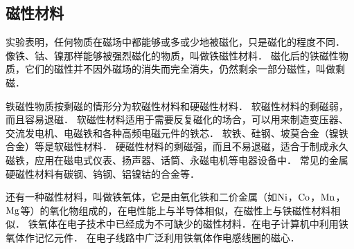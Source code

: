 \subsection{磁性材料}

实验表明，任何物质在磁场中都能够或多或少地被磁化，只是磁化的程度不同．
像铁、钴、镍那样能够被强烈磁化的物质，叫做铁磁性材料．
磁化后的铁磁性物质，它们的磁性并不因外磁场的消失而完全消失，仍然剩余一部分磁性，叫做剩磁．

铁磁性物质按剩磁的情形分为软磁性材料和硬磁性材料．
软磁性材料的剩磁弱，而且容易退磁．
软磁性材料适用于需要反复磁化的场合，可以用来制造变压器、交流发电机、电磁铁和各种高频电磁元件的铁芯．
软铁、硅钢、坡莫合金（镍铁合金）等是软磁性材料．
硬磁性材料的剩磁强，而且不易退磁，适合于制成永久磁铁，应用在磁电式仪表、扬声器、话筒、永磁电机等电器设备中．
常见的金属硬磁性材料有碳钢、钨钢、铝镍钴的合金等．

还有一种磁性材料，叫做铁氧体，它是由氧化铁和二价金属（如$ \rm{Ni} $，$ \rm{Co} $，$ \rm{Mn} $，$ \rm{Mg} $等）的氧化物组成的，在电性能上与半导体相似，在磁性上与铁磁性材料相似．
铁氧体在电子技术中已经成为不可缺少的磁性材料．在电子计算机中利用铁氧体作记忆元件．
在电子线路中广泛利用铁氧体作电感线圈的磁心．

